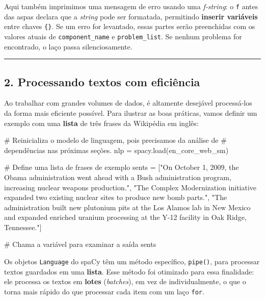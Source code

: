\documentclass[
  brazilian,
  11pt,
]{article}
\newenvironment{Shaded}{\begin{snugshade}}{\end{snugshade}}
\newcommand{\CommentTok}[1]{\textcolor[rgb]{0.48,0.49,0.49}{#1}}
\newcommand{\NormalTok}[1]{\textcolor[rgb]{0.81,0.81,0.76}{#1}}
\newcommand{\OperatorTok}[1]{\textcolor[rgb]{0.81,0.81,0.76}{#1}}
\newcommand{\StringTok}[1]{\textcolor[rgb]{0.96,0.31,0.31}{#1}}
\let\oldtexttt\texttt
\renewcommand{\texttt}[1]{{\color{inlink}\oldtexttt{#1}}}
\begin{document}
Aqui também imprimimos uma mensagem de erro usando uma \emph{f‑string}:
o \texttt{f} antes das aspas declara que a \emph{string} pode ser
formatada, permitindo \textbf{inserir variáveis} entre chaves
\texttt{\{\}}. Se um erro for levantado, essas partes serão preenchidas
com os valores atuais de \texttt{component\_name} e
\texttt{problem\_list}. Se nenhum problema for encontrado, o laço passa
silenciosamente.

\begin{center}\rule{0.5\linewidth}{0.5pt}\end{center}

\subsection{2. Processando textos com
eficiência}\label{processando-textos-com-eficiuxeancia}

Ao trabalhar com grandes volumes de dados, é altamente desejável
processá‑los da forma mais eficiente possível. Para ilustrar as boas
práticas, vamos definir um exemplo com uma \textbf{lista} de três frases
da Wikipédia em inglês:

\begin{Shaded}
\begin{Highlighting}[]
\CommentTok{\# Reinicializa o modelo de linguagem, pois precisamos da análise de}
\CommentTok{\# dependências nas próximas seções.}
\NormalTok{nlp }\OperatorTok{=}\NormalTok{ spacy.load(}\StringTok{\textquotesingle{}en\_core\_web\_sm\textquotesingle{}}\NormalTok{)}

\CommentTok{\# Define uma lista de frases de exemplo}
\NormalTok{sents }\OperatorTok{=}\NormalTok{ [}\StringTok{"On October 1, 2009, the Obama administration went ahead with a Bush administration program, increasing nuclear weapons production."}\NormalTok{,}
         \StringTok{"The \textquotesingle{}Complex Modernization\textquotesingle{} initiative expanded two existing nuclear sites to produce new bomb parts."}\NormalTok{,}
         \StringTok{"The administration built new plutonium pits at the Los Alamos lab in New Mexico and expanded enriched uranium processing at the Y{-}12 facility in Oak Ridge, Tennessee."}\NormalTok{]}

\CommentTok{\# Chama a variável para examinar a saída}
\NormalTok{sents}
\end{Highlighting}
\end{Shaded}

Os objetos \texttt{Language} do spaCy têm um método específico,
\texttt{pipe()}, para processar textos guardados em uma \textbf{lista}.
Esse método foi otimizado para essa finalidade: ele processa os textos
em \textbf{lotes} (\emph{batches}), em vez de individualmente, o que o
torna mais rápido do que processar cada item com um laço \texttt{for}.
\end{document}
